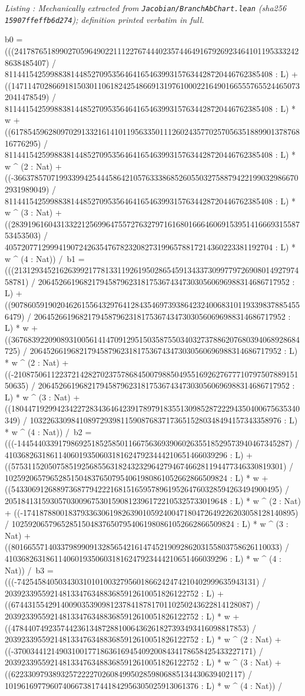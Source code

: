 \documentclass[a4paper,11pt]{article}
\newcounter{leanlisting}
\newenvironment{leanlisting}[2]{%
  \refstepcounter{leanlisting}\label{#2}%
  \begin{center}\textit{\small Listing \theleanlisting: #1}\end{center}%
  \Verbatim[breaklines=true,breakanywhere=true,fontsize=\footnotesize,frame=single,framesep=4pt,rulecolor=\color{gray!50},fillcolor=\color{gray!5}]%
}{%
  \endVerbatim%
}
\theoremstyle{plain}
\theoremstyle{definition}
\theoremstyle{remark}
\begin{document}
\begin{leanlisting}{Mechanically extracted from \texttt{Jacobian/BranchAbChart.lean} (sha256 \texttt{15907ffeffb6d274}); definition printed verbatim in full.}{lst:def-chartclass}
      b0 = (((2417876518990270596490221112276744402357446491679269234641011953332428638485407) / 81144154259988381448527095356464165463993157634428720446762385408 : L) + ((14711470286691815030110618242548669131976100022164901665557655244650732041478549) / 81144154259988381448527095356464165463993157634428720446762385408 : L) * w + ((617854596280970291332161410119563350111260243577025705635188990137876816776295) / 81144154259988381448527095356464165463993157634428720446762385408 : L) * w ^ (2 : Nat) + ((-3663785707199339942544458642105763338685260550327588794221990329866702931989049) / 81144154259988381448527095356464165463993157634428720446762385408 : L) * w ^ (3 : Nat) + ((283919616043133221256996475572763279716168016664606915395141666931558753453503) / 40572077129994190724263547678232082731996578817214360223381192704 : L) * w ^ (4 : Nat)) /\
      b1 = (((21312934521626399217781331192619502865459134337309977972690801492797458781) / 2064526619682179458796231817536743473030560696988314686717952 : L) + ((90786059190204626155643297641284354697393864232400683101193398378854556479) / 2064526619682179458796231817536743473030560696988314686717952 : L) * w + ((3676839220908931005614147091295150358755034032737886207680394068928684725) / 2064526619682179458796231817536743473030560696988314686717952 : L) * w ^ (2 : Nat) + ((-21087506112237214282702375786845007988504955169262767771079750788915150635) / 2064526619682179458796231817536743473030560696988314686717952 : L) * w ^ (3 : Nat) + ((1804471929942342272834364642391789791835513098528722294350400675635340349) / 1032263309841089729398115908768371736515280348494157343358976 : L) * w ^ (4 : Nat)) /\
      b2 = (((-144544033917986925185258501166756369390602635518529573940467345287) / 410368263186114060193506031816247923444210651466039296 : L) + ((575311520507585192568556318243232964279467466281194477346330819301) / 102592065796528515048376507954061980861052662866509824 : L) * w + ((54330691268897368779422216815165957896195264760328594263494900495) / 205184131593057030096753015908123961722105325733019648 : L) * w ^ (2 : Nat) + ((-174187880018379336306198263901059240047180472649226203058128140895) / 102592065796528515048376507954061980861052662866509824 : L) * w ^ (3 : Nat) + ((80166557140337989909132856542161474521909286203155803758626110033) / 410368263186114060193506031816247923444210651466039296 : L) * w ^ (4 : Nat)) /\
      b3 = (((-7425458405034303101010032795601866242474210402999635943131) / 20392339559214813347634883685912610051826122752 : L) + ((6744315542914009035390981237841878170110250243622814128087) / 20392339559214813347634883685912610051826122752 : L) * w + ((478440749235744236134872881006436261827393493416098817853) / 20392339559214813347634883685912610051826122752 : L) * w ^ (2 : Nat) + ((-3700344121490310017718636169454092008434178658425433227171) / 20392339559214813347634883685912610051826122752 : L) * w ^ (3 : Nat) + ((62233097938932572222702608499502859806885134430639402117) / 10196169779607406673817441842956305025913061376 : L) * w ^ (4 : Nat)) /\

\end{leanlisting}
\end{document}
